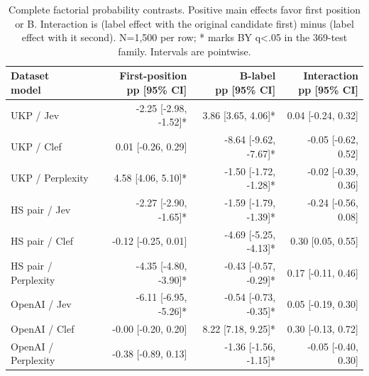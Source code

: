 \begin{table}[t]
\centering\footnotesize
\setlength{\tabcolsep}{3.5pt}
\begin{tabular}{@{}lrrr@{}}
\toprule
\shortstack[l]{Dataset\\{}model} & \shortstack[l]{First-position\\{}pp [95\% CI]} & \shortstack[l]{B-label\\{}pp [95\% CI]} & \shortstack[l]{Interaction\\{}pp [95\% CI]} \\
\midrule
UKP / Jev & -2.25 [-2.98, -1.52]* & 3.86 [3.65, 4.06]* & 0.04 [-0.24, 0.32] \\
UKP / Clef & 0.01 [-0.26, 0.29] & -8.64 [-9.62, -7.67]* & -0.05 [-0.62, 0.52] \\
UKP / Perplexity & 4.58 [4.06, 5.10]* & -1.50 [-1.72, -1.28]* & -0.02 [-0.39, 0.36] \\
HS pair / Jev & -2.27 [-2.90, -1.65]* & -1.59 [-1.79, -1.39]* & -0.24 [-0.56, 0.08] \\
HS pair / Clef & -0.12 [-0.25, 0.01] & -4.69 [-5.25, -4.13]* & 0.30 [0.05, 0.55] \\
HS pair / Perplexity & -4.35 [-4.80, -3.90]* & -0.43 [-0.57, -0.29]* & 0.17 [-0.11, 0.46] \\
OpenAI / Jev & -6.11 [-6.95, -5.26]* & -0.54 [-0.73, -0.35]* & 0.05 [-0.19, 0.30] \\
OpenAI / Clef & -0.00 [-0.20, 0.20] & 8.22 [7.18, 9.25]* & 0.30 [-0.13, 0.72] \\
OpenAI / Perplexity & -0.38 [-0.89, 0.13] & -1.36 [-1.56, -1.15]* & -0.05 [-0.40, 0.30] \\
\bottomrule
\end{tabular}
\caption{Complete factorial probability contrasts. Positive main effects favor first position or B. Interaction is (label effect with the original candidate first) minus (label effect with it second). N=1,500 per row; * marks BY q<.05 in the 369-test family. Intervals are pointwise.}
\label{tab:appendix_factorial_probability}
\end{table}
